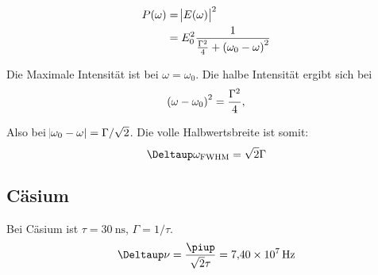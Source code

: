 \begin{align*}
	P(\omega)
	&= \abs{E(\omega)}^2 \\
	&= E_0^2 \frac1{\frac{\Gamma^2}4 + \del{\omega_0 - \omega}^2}
\end{align*}

Die Maximale Intensität ist bei $\omega = \omega_0$. Die halbe Intensität ergibt sich bei
\[
	\del{\omega - \omega_0}^2 = \frac{\Gamma^2}4,
\]

Also bei $\abs{\omega_0 - \omega} = \Gamma / \sqrt 2$. Die volle Halbwertsbreite ist somit:
\[
	\Deltaup \omega_\text{FWHM} = \sqrt 2 \Gamma
\]

\subsection{Cäsium}

Bei Cäsium ist $\tau = \SI{30}{\nano\second}$, $\Gamma = 1/\tau$.
\[
	\Deltaup\nu = \frac{\piup}{\sqrt 2 \tau} = \SI{7.40e7}\hertz
\]


\IfFileExists{\bibliographyfile}{
	
}{}



